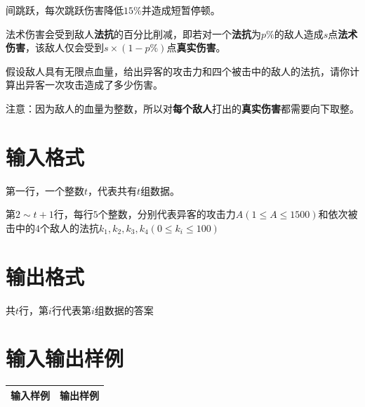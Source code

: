 \documentclass[
	lang=cn,
	color=green
]{elegantbook}
\begin{document}
间跳跃，每次跳跃伤害降低$15\%$并造成短暂停顿。

法术伤害会受到敌人\textbf{法抗}的百分比削减，即若对一个\textbf{法抗}为$p\%$的敌人造成$s$点\textbf{法术伤害}，该敌人仅会受到$s \times (1-p\%)$点\textbf{真实伤害}。

假设敌人具有无限点血量，给出异客的攻击力和四个被击中的敌人的法抗，请你计算出异客一次攻击造成了多少伤害。

注意：因为敌人的血量为整数，所以对\textbf{每个敌人}打出的\textbf{真实伤害}都需要向下取整。

\section*{输入格式}
第一行，一个整数$t$，代表共有$t$组数据。

第$2 \sim t+1$行，每行$5$个整数，分别代表异客的攻击力$A(1 \leq A \leq 1500)$和依次被击中的$4$个敌人的法抗$k_1,k_2,k_3,k_4(0 \leq k_i \leq 100)$

\section*{输出格式}
共$t$行，第$i$行代表第$i$组数据的答案

\section*{输入输出样例}
\begin{tabularx}{450pt}{X|X}
    \toprule
    输入样例 & 输出样例 \\
    \midrule

    \bottomrule
\end{tabularx}
\end{document}
